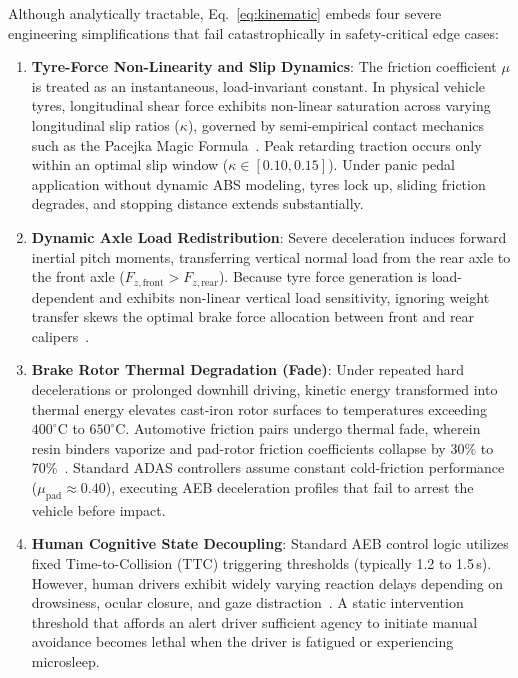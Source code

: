 \documentclass[3p,twocolumn]{elsarticle}
\begin{document}
Although analytically tractable, Eq.~\eqref{eq:kinematic} embeds four severe engineering simplifications that fail catastrophically in safety-critical edge cases:
\begin{enumerate}
  \item \textbf{Tyre-Force Non-Linearity and Slip Dynamics}: The friction coefficient $\mu$ is treated as an instantaneous, load-invariant constant. In physical vehicle tyres, longitudinal shear force exhibits non-linear saturation across varying longitudinal slip ratios ($\kappa$), governed by semi-empirical contact mechanics such as the Pacejka Magic Formula~\cite{pacejka1992,pacejka2005}. Peak retarding traction occurs only within an optimal slip window ($\kappa \in [0.10, 0.15]$). Under panic pedal application without dynamic ABS modeling, tyres lock up, sliding friction degrades, and stopping distance extends substantially.
  \item \textbf{Dynamic Axle Load Redistribution}: Severe deceleration induces forward inertial pitch moments, transferring vertical normal load from the rear axle to the front axle ($F_{z,\text{front}} > F_{z,\text{rear}}$). Because tyre force generation is load-dependent and exhibits non-linear vertical load sensitivity, ignoring weight transfer skews the optimal brake force allocation between front and rear calipers~\cite{rajamani2011,gillespie1992}.
  \item \textbf{Brake Rotor Thermal Degradation (Fade)}: Under repeated hard decelerations or prolonged downhill driving, kinetic energy transformed into thermal energy elevates cast-iron rotor surfaces to temperatures exceeding $400^\circ\text{C}$ to $650^\circ\text{C}$. Automotive friction pairs undergo thermal fade, wherein resin binders vaporize and pad-rotor friction coefficients collapse by 30\% to 70\%~\cite{day2014,tirovic2007,limpert2011}. Standard ADAS controllers assume constant cold-friction performance ($\mu_{\text{pad}} \approx 0.40$), executing AEB deceleration profiles that fail to arrest the vehicle before impact.
  \item \textbf{Human Cognitive State Decoupling}: Standard AEB control logic utilizes fixed Time-to-Collision (TTC) triggering thresholds (typically 1.2 to 1.5\,s). However, human drivers exhibit widely varying reaction delays depending on drowsiness, ocular closure, and gaze distraction~\cite{soukupova2016,dua2013}. A static intervention threshold that affords an alert driver sufficient agency to initiate manual avoidance becomes lethal when the driver is fatigued or experiencing microsleep.
\end{enumerate}
\end{document}
